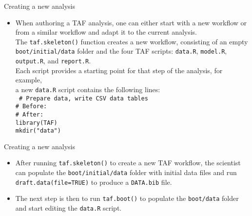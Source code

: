 \documentclass[aspectratio=169]{beamer}
\begin{document}
\begin{frame}{Creating a new analysis}\small
  \begin{itemize}
    \item[] When authoring a TAF analysis, one can either start with a new
    workflow or\\
    from a similar workflow and adapt it to the current analysis.\\[2ex]
    The {\tt\blue taf.skeleton()} function creates a new workflow, consisting of
    an empty\\
    {\tt boot/initial/data} folder and the four TAF scripts: {\tt data.R},
    {\tt model.R},\\
    {\tt output.R}, and {\tt report.R}.\\[2ex]
    Each script provides a starting point for that step of the analysis, for
    example,\\
    a new {\tt data.R} script contains the following lines:\\[2ex]\tt\fns
    {\gray \# Prepare data, write CSV data tables}\\[2ex]
    {\gray \# Before:}\\
    {\gray \# After:}\\[2ex]
    {\blue library}(TAF)\\[2ex]
    {\blue mkdir}("data")\\[4ex]
  \end{itemize}
\end{frame}


\begin{frame}{Creating a new analysis}\small
  \begin{itemize}
    \item[] After running {\tt\blue taf.skeleton()} to create a new TAF
    workflow, the scientist\\[0.2ex]
    can populate the {\tt boot/initial/data} folder with initial data files and
    run\\[0.2ex]
    {\tt\blue draft.data(file=TRUE)} to produce a {\tt DATA.bib} file.\\[4ex]
    \item[] The next step is then to run {\tt\blue taf.boot()} to populate the
    {\tt boot/data} folder\\[0.2ex]
    and start editing the {\tt data.R} script.\\[6ex]
  \end{itemize}
\end{frame}
\end{document}
